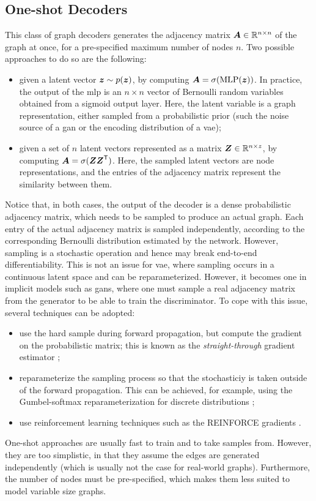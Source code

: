 \subsection{One-shot Decoders}
This class of graph decoders generates the adjacency matrix $\Matrix{A} \in \Real^{n \times n}$ of the graph at once, for a pre-specified maximum number of nodes $n$. Two possible approaches to do so are the following:
\begin{itemize}
    \item given a latent vector $\Vector{z} \sim p(\Vector{z})$, by computing $\Matrix{A} = \sigma(\Fun{MLP}(\Vector{z}))$. In practice, the output of the \gls{mlp} is an $n \times n$ vector of Bernoulli random variables obtained from a sigmoid output layer. Here, the latent variable is a graph representation, either sampled from a probabilistic prior (such the noise source of a \gls{gan} or the encoding distribution of a \gls{vae});
    \item given a set of $n$ latent vectors represented as a matrix $\Matrix{Z} \in \Real^{n \times z}$, by computing $\Matrix{A} = \sigma(\Matrix{Z}\Matrix{Z}^{\Transpose})$. Here, the sampled latent vectors are node representations, and the entries of the adjacency matrix represent the similarity between them.
\end{itemize}
Notice that, in both cases, the output of the decoder is a dense probabilistic adjacency matrix, which needs to be sampled to produce an actual graph. Each entry of the actual adjacency matrix is sampled independently, according to the corresponding Bernoulli distribution estimated by the network. However, sampling is a stochastic operation and hence may break end-to-end differentiability. This is not an issue for \gls{vae}, where sampling occurs in a continuous latent space and can be reparameterized. However, it becomes one in implicit models such as \glspl{gan}, where one must sample a real adjacency matrix from the generator to be able to train the discriminator. To cope with this issue, several techniques can be adopted:
\begin{itemize}
    \item use the hard sample during forward propagation, but compute the gradient on the probabilistic matrix; this is known as the \emph{straight-through} gradient estimator \citep{straightthrough};
    \item reparameterize the sampling process so that the stochasticiy is taken outside of the forward propagation. This can be achieved, for example, using the Gumbel-softmax reparameterization for discrete distributions \citep{janggumbel};
    \item use reinforcement learning techniques such as the REINFORCE gradients \citep{reinforce}.
\end{itemize}
One-shot approaches are usually fast to train and to take samples from. However, they are too simplistic, in that they assume the edges are generated independently (which is usually not the case for real-world graphs). Furthermore, the number of nodes must be pre-specified, which makes them less suited to model variable size graphs.

